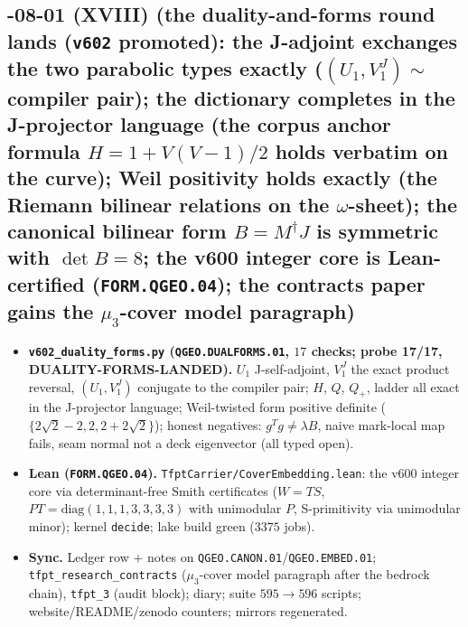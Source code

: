 \documentclass[11pt]{article}
\begin{document}
\subsection*{-08-01 (XVIII) (the duality-and-forms round lands (\texttt{v602} promoted): the J-adjoint exchanges the two parabolic types exactly ($(U_1,V_1^J)\sim$ compiler pair); the dictionary completes in the J-projector language (the corpus anchor formula $H=1+V(V-1)/2$ holds verbatim on the curve); Weil positivity holds exactly (the Riemann bilinear relations on the $\omega$-sheet); the canonical bilinear form $B=M^\dagger J$ is symmetric with $\det B=8$; the v600 integer core is Lean-certified (\texttt{FORM.QGEO.04}); the contracts paper gains the $\mu_3$-cover model paragraph)}
\begin{itemize}[leftmargin=1.5em]
\item \textbf{\texttt{v602\_duality\_forms.py} (\texttt{QGEO.DUALFORMS.01}, $17$ checks; probe
17/17, DUALITY-FORMS-LANDED).} $U_1$ J-self-adjoint, $V_1^J$ the exact product reversal,
$(U_1,V_1^J)$ conjugate to the compiler pair; $H$, $Q$, $Q_+$, ladder all exact in the
J-projector language; Weil-twisted form positive definite ($\{2\sqrt2-2,2,2+2\sqrt2\}$);
honest negatives: $g^Tg\ne\lambda B$, naive mark-local map fails, seam normal not a deck
eigenvector (all typed open).
\item \textbf{Lean (\texttt{FORM.QGEO.04}).} \texttt{TfptCarrier/CoverEmbedding.lean}: the
v600 integer core via determinant-free Smith certificates ($W=TS$,
$PT=\mathrm{diag}(1,1,1,3,3,3,3)$ with unimodular $P$, S-primitivity via unimodular minor);
kernel \texttt{decide}; lake build green ($3375$ jobs).
\item \textbf{Sync.} Ledger row + notes on \texttt{QGEO.CANON.01}/\texttt{QGEO.EMBED.01};
\texttt{tfpt\_research\_contracts} ($\mu_3$-cover model paragraph after the bedrock chain),
\texttt{tfpt\_3} (audit block); diary; suite $595\to596$ scripts; website/README/zenodo
counters; mirrors regenerated.
\end{itemize}
\end{document}
